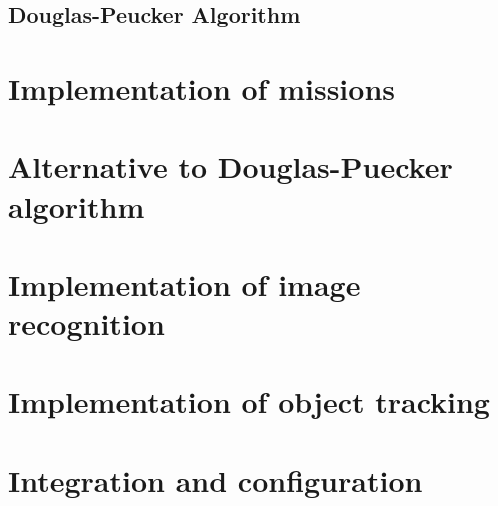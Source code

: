 \subsection{Douglas-Peucker Algorithm}
\subsection{}

\section{Implementation of missions}

\section{Alternative to Douglas-Puecker algorithm}

\section{Implementation of image recognition}

\section{Implementation of object tracking}

\section{Integration and configuration}






